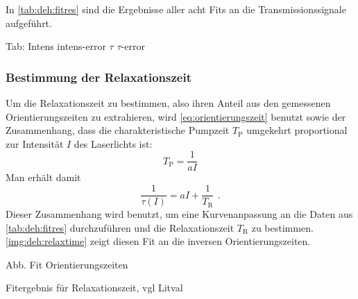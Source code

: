 In \autoref{tab:deh:fitres} sind die Ergebnisse aller acht Fits an die Transmissionssignale aufgeführt.

Tab:
Intens		intens-error	$\tau$		$\tau$-error
 

\subsubsection*{Bestimmung der Relaxationszeit}
Um die Relaxationszeit zu bestimmen, also ihren Anteil aus den gemessenen Orientierungszeiten zu extrahieren,
wird \autoref{eq:orientierungszeit} benutzt sowie der Zusammenhang,
dass die charakteristische Pumpzeit $T_\text{P}$ umgekehrt proportional zur Intensität $I$ des Laserlichts ist:
\begin{equation}
  T_\text{P} = \frac{1}{aI} 
\end{equation}
Man erhält damit
\begin{equation}
  \frac{1}{\tau(I)}=aI + \frac{1}{T_\text{R}} \ \,.
\end{equation}
Dieser Zusammenhang wird benutzt, um eine Kurvenanpassung an die Daten aus \autoref{tab:deh:fitres}
durchzuführen und die Relaxationszeit $T_\text{R}$ zu bestimmen.
\autoref{img:deh:relaxtime} zeigt diesen Fit an die inversen Orientierungszeiten.


Abb. Fit Orientierungszeiten




Fitergebnis für Relaxationszeit, vgl Litval

